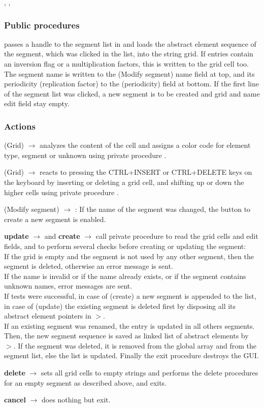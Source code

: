 \documentclass[12pt]{article}
\newcommand\code[1]{{\tt #1}}
\newcommand{\ofld}[1]{\colorbox{black!15}{{{\color{black}\bf #1}}}}
\newcommand{\ofldx}[1]{\colorbox{black!15}{{\color{black}(#1)}}}
\newcommand\guico[1]{{\color{blue}\code{#1}}}
\newcommand{\unico}[1]{{\color{burntorange}\code{#1}}}
\newcommand{\evcod}[2]{\ofld{#1} $\rightarrow$ \guico{#2}}
\newcommand{\evcodx}[2]{\ofldx{#1} $\rightarrow$ \guico{#2}}
\newcommand{\prcod}[2]{\opauni{#1}$>$\unico{#2}}
\newcommand{\opagui}[1]{\colorbox{blue!20}{{\color{black}\code{#1}}}}
\newcommand{\ogui}[1]{\hyperref[#1]{\opagui{#1}}}
\newcommand{\opauni}[1]{\colorbox{orange!30}{{\color{black}\code{#1}}}}
\newcommand{\ouni}[1]{\hyperref[#1]{\opauni{#1}}}
\newcommand{\uses}[1]{\flushleft {\bf Uses:} #1}
\newcommand{\act}[1]{\subsubsection*{Actions} #1}
\newcommand{\ppro}[1]{\subsubsection*{Public procedures} #1}
\begin{document}
\uses{\ouni{globlib}, \ouni{editorlib}, \ouni{comauxlib}}

\ppro{
\guico{Init} passes a handle to the segment list in \ogui{opaeditor} and loads the abstract element sequence of the segment, which was clicked in the list, into the string grid. If entries contain an inversion flag or a multiplication factors, this is written to the grid cell too. The segment name is written to the \ofldx{Modify segment} name field at top, and its periodicity (replication factor) to the \ofldx{periodicity} field at bottom. If the first line of the segment list was clicked, a new segment is to be created and grid and name edit field stay empty.
}
\act{
\evcodx{Grid}{drawCell} analyzes the content of the cell and assigns a color code for element type, segment or unknown using private procedure \guico{ElemCol\_C}.

\evcodx{Grid}{gridKeyDown} reacts to pressing the CTRL+INSERT or CTRL+DELETE keys on the keyboard by inserting or deleting a grid cell, and shifting up or down the higher cells using private procedure \guico{ShiftCells}.

\evcodx{Modify segment}{EditSegNameChange}: If the name of the segment was changed, the button to create a new segment is enabled.

\evcod{update}{butokClick} and \evcod{create}{butcreClick} call private procedure \guico{SaveSeg} to read the grid cells and edit fields, and to perform several checks before creating or updating the segment:\\
If the grid is empty and the segment is not used by any other segment, then the segment is deleted, otherwise an error message is sent.\\
If the name is invalid or if the name already exists, or if the  segment contains unknown names, error messages are sent.\\
If tests were successful, in case of \ofldx{create} a new segment is appended to the list, in case of \ofldx{update} the existing segment is deleted first by disposing all its abstract element pointers in \prcod{editorlib}{ClearSeg}.\\
If an existing segment was renamed, the entry is updated in all others segments. Then, 
the new segment sequence is saved as linked list of abstract elements by \prcod{editorlib}{AppendAE}. If the segment was deleted, it is removed from the global \unico{Segm} array and from the \ogui{opaeditor} segment list, else the list is updated. Finally the exit procedure destroys the GUI.

\evcod{delete}{butdelClick} sets all grid cells to empty strings and performs the delete procedures for an empty segment as described above, and exits.

\evcod{cancel}{butcanClick} does nothing but exit.
}
\end{document}
